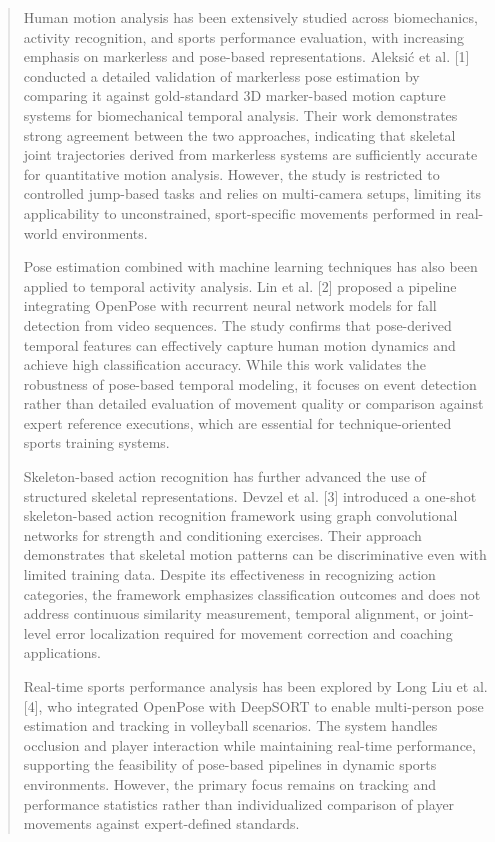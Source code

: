 \documentclass[
]{article}
\begin{document}
\begin{quote}
Human motion analysis has been extensively studied across biomechanics,
activity recognition, and sports performance evaluation, with increasing
emphasis on markerless and pose-based representations. Aleksić et al.
{[}1{]} conducted a detailed validation of markerless pose estimation by
comparing it against gold-standard 3D marker-based motion capture
systems for biomechanical temporal analysis. Their work demonstrates
strong agreement between the two approaches, indicating that skeletal
joint trajectories derived from markerless systems are sufficiently
accurate for quantitative motion analysis. However, the study is
restricted to controlled jump-based tasks and relies on multi-camera
setups, limiting its applicability to unconstrained, sport-specific
movements performed in real-world environments.

Pose estimation combined with machine learning techniques has also been
applied to temporal activity analysis. Lin et al. {[}2{]} proposed a
pipeline integrating OpenPose with recurrent neural network models for
fall detection from video sequences. The study confirms that
pose-derived temporal features can effectively capture human motion
dynamics and achieve high classification accuracy. While this work
validates the robustness of pose-based temporal modeling, it focuses on
event detection rather than detailed evaluation of movement quality or
comparison against expert reference executions, which are essential for
technique-oriented sports training systems.

Skeleton-based action recognition has further advanced the use of
structured skeletal representations. Devzel et al. {[}3{]} introduced a
one-shot skeleton-based action recognition framework using graph
convolutional networks for strength and conditioning exercises. Their
approach demonstrates that skeletal motion patterns can be
discriminative even with limited training data. Despite its
effectiveness in recognizing action categories, the framework emphasizes
classification outcomes and does not address continuous similarity
measurement, temporal alignment, or joint-level error localization
required for movement correction and coaching applications.

Real-time sports performance analysis has been explored by Long Liu et
al. {[}4{]}, who integrated OpenPose with DeepSORT to enable
multi-person pose estimation and tracking in volleyball scenarios. The
system handles occlusion and player interaction while maintaining
real-time performance, supporting the feasibility of pose-based
pipelines in dynamic sports environments. However, the primary focus
remains on tracking and performance statistics rather than
individualized comparison of player movements against expert-defined
standards.


\end{quote}
\end{document}
